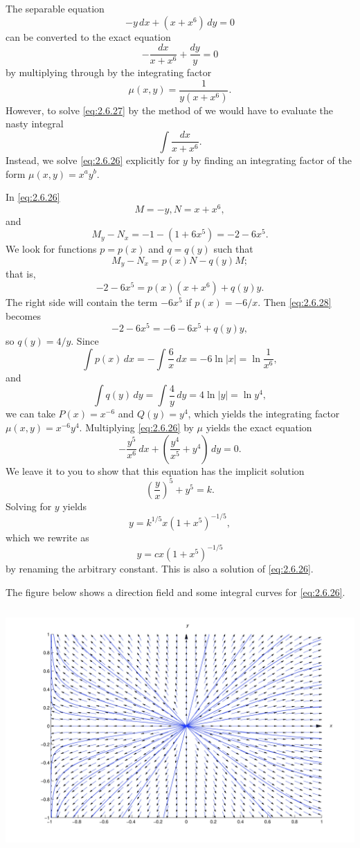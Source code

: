 \documentclass{ximera}
\begin{document}
\begin{example}\label{example:2.6.4}
The separable  equation
\begin{equation}\label{eq:2.6.26}
-y\,dx+(x+x^6)\,dy=0
\end{equation}
can be converted to the exact equation
\begin{equation} \label{eq:2.6.27}
-\frac{dx}{x+x^6}+\frac{dy}{y}=0
\end{equation}
by multiplying through
by the  integrating factor
$$
\mu(x,y)=\frac{1}{y(x+x^6)}.
$$
However, to solve \eqref{eq:2.6.27} by the method of 
we would have to evaluate the nasty integral
$$
\int \frac{dx}{x+x^6}.
$$
Instead, we solve \eqref{eq:2.6.26} explicitly for $y$ by finding  an
integrating factor of the form
$\mu(x,y)=x^ay^b$.

In \eqref{eq:2.6.26}
$$
M=-y, N=x+x^6,
$$
and
$$
M_y-N_x=-1-(1+6x^5)=-2-6x^5.
$$
We  look for functions
$p=p(x)$ and $q=q(y)$ such that
$$
M_y-N_x=p(x)N-q(y)M;
$$
that is,
\begin{equation}\label{eq:2.6.28}
-2-6x^5=p(x)(x+x^6)+q(y)y.
\end{equation}
The right side will contain the term $-6x^5$ if $p(x)=-6/x$.   Then
\eqref{eq:2.6.28} becomes
$$
-2-6x^5=-6-6x^5+q(y)y,
$$
so  $q(y)=4/y$.  Since
$$
\int p(x)\,dx=-\int\frac{6}{x}\,dx=-6\ln|x|=\ln\frac{1}{x^6},
$$
 and
$$
\int q(y)\,dy=\int\frac{4}{y}\,dy=4\ln
|y|=\ln{y^4},
$$
we can take $P(x)=x^{-6}$ and $Q(y)=y^4$,
which yields the integrating factor $\mu(x,y)=x^{-6}y^4$.
Multiplying \eqref{eq:2.6.26} by  $\mu$ yields the exact equation
$$
-\frac{y^5}{x^6}\,dx+\left(\frac{y^4}{x^5}+y^4\right)
\,dy=0.
$$
 We leave it to you to 
show that this equation has the implicit solution 
$$
\left(\frac{y}{x}\right)^5+y^5=k.
$$
 Solving for $y$ yields
$$
y=k^{1/5}x(1+x^5)^{-1/5},
$$
which we rewrite as
$$
y=cx(1+x^5)^{-1/5}
$$
by renaming the arbitrary constant.
 This is also a solution of \eqref{eq:2.6.26}.

The figure below shows a direction field and some integral curves
 for \eqref{eq:2.6.26}.
 
 \begin{image}
\includegraphics[height=3.66in]{fig020604.jpg}
\end{image}

\end{example}
\end{document}
